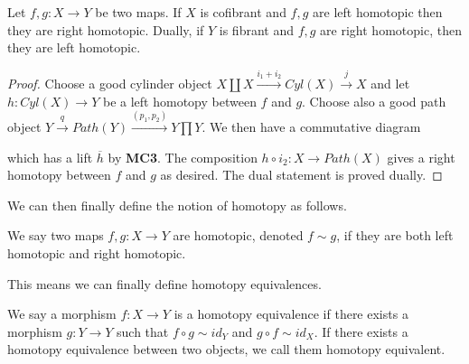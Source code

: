 \begin{lemma}
Let $f,g:X\rightarrow Y$ be two maps. If $X$ is cofibrant and $f,g$ are left homotopic then they are right homotopic. Dually, if $Y$ is fibrant and $f,g$ are right homotopic, then they are left homotopic.
\end{lemma}
\begin{proof}
Choose a good cylinder object $X\coprod X \overset{i_1 + i_2}\rightarrow Cyl(X) \overset{j}\rightarrow X$ and let $h:Cyl(X)\rightarrow Y$ be a left homotopy between $f$ and $g$. Choose also a good path object $Y\overset{q}\rightarrow Path(Y) \overset{(p_1, p_2)}\rightarrow Y\prod Y$. We then have a commutative diagram
\begin{center}
\end{center}
which has a lift $\overline{h}$ by \textbf{MC3}. 
The composition $h\circ i_2:X\rightarrow Path(X)$ gives a right homotopy between $f$ and $g$ as desired. The dual statement is proved dually.
\end{proof}

We can then finally define the notion of homotopy as follows. 

\begin{definition}
We say two maps $f,g:X\rightarrow Y$ are homotopic, denoted $f\sim g$, if they are both left homotopic and right homotopic.
\end{definition}

This means we can finally define homotopy equivalences. 

\begin{definition}
We say a morphism $f\colon X\longrightarrow Y$ is a homotopy equivalence if there exists a morphism $g\colon Y\longrightarrow Y$ such that $f\circ g \sim id_Y$ and $g\circ f \sim id_X$. If there exists a homotopy equivalence between two objects, we call them homotopy equivalent.
\end{definition}

